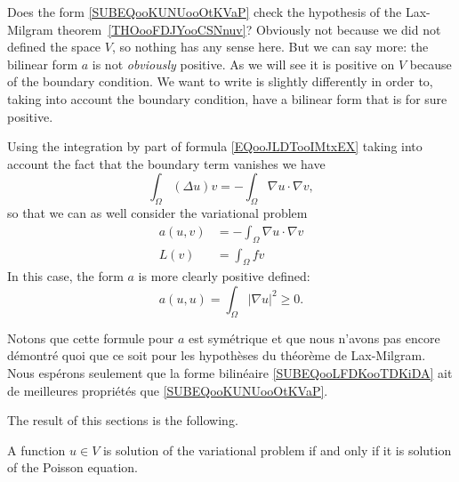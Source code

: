 Does the form \eqref{SUBEQooKUNUooOtKVaP} check the hypothesis of the Lax-Milgram theorem~\ref{THOooFDJYooCSNnuv}? Obviously not because we did not defined the space \( V\), so nothing has any sense here. But we can say more: the bilinear form \( a\) is not \emph{obviously} positive. As we will see it is positive on \( V\) because of the boundary condition. We want to write is slightly differently in order to, taking into account the boundary condition, have a bilinear form that is for sure positive.

Using the integration by part of formula \eqref{EQooJLDTooIMtxEX} taking into account the fact that the boundary term vanishes we have
\begin{equation}
	\int_{\Omega}(\Delta u)v=-\int_{\Omega}\nabla u\cdot \nabla v,
\end{equation}
so that we can as well consider the variational problem
\begin{subequations}
	\begin{align}
		a(u,v) & =-\int_{\Omega}\nabla u\cdot \nabla v   \label{SUBEQooLFDKooTDKiDA} \\
		L(v)   & =\int_{\Omega}fv
	\end{align}
\end{subequations}
In this case, the form \( a\) is more clearly positive defined:
\begin{equation}
	a(u,u)=\int_{\Omega}| \nabla u |^2\geq 0.
\end{equation}

Notons que cette formule pour \( a\) est symétrique et que nous n'avons pas encore démontré quoi que ce soit pour les hypothèses du théorème de Lax-Milgram. Nous espérons seulement que la forme bilinéaire \eqref{SUBEQooLFDKooTDKiDA} ait de meilleures propriétés que \eqref{SUBEQooKUNUooOtKVaP}.

The result of this sections is the following.
\begin{proposition}
	A function \( u\in V\) is solution of the variational problem if and only if it is solution of the Poisson equation.
\end{proposition}

